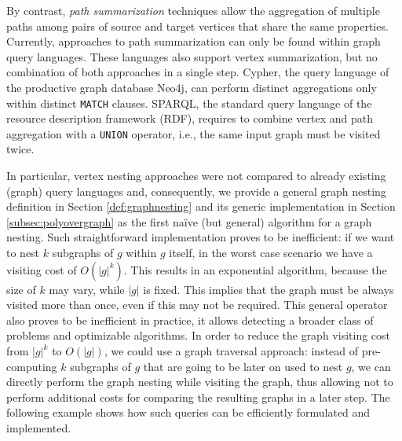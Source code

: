 By contrast, \textit{path summarization} techniques allow the aggregation of multiple paths among pairs of source and target vertices that share the same properties. Currently, approaches to path summarization can only be found within graph query languages. These languages also support vertex summarization, but no combination of both approaches in a single step. Cypher, the query language of the productive graph database Neo4j, can perform distinct aggregations only within distinct \texttt{MATCH} clauses. SPARQL, the standard query language of the resource description framework (RDF), requires to combine vertex and path aggregation with a \texttt{UNION} operator, i.e., the same input graph must be visited twice. 


In particular, vertex nesting approaches were not compared to already existing (graph) query languages and, consequently, we provide a general graph nesting definition in Section \vref{def:graphnesting} and its generic implementation in Section \vref{subsec:polyovergraph} as the first naïve (but general) algorithm for a graph nesting. Such straightforward implementation proves to be inefficient: if we want to nest $k$ subgraphs of $g$ within $g$ itself, in the worst case scenario we have a visiting cost of $O(|g|^k)$. This results in an exponential algorithm, because the size of $k$ may vary, while $|g|$ is fixed. This implies that the graph must be always visited more than once, even if this may not be required. This general operator also proves to be inefficient in practice, it allows detecting a broader class of problems and optimizable algorithms. In order to reduce the graph visiting cost from $|g|^k$ to $O(|g|)$, we could use a graph traversal approach: instead of pre-computing $k$ subgraphs of $g$ that are going to be later on used to nest $g$, we can directly perform the graph nesting while visiting the graph, thus allowing  not to perform additional costs for comparing the resulting graphs in a later step. The following example shows how such queries can be efficiently formulated and implemented.

